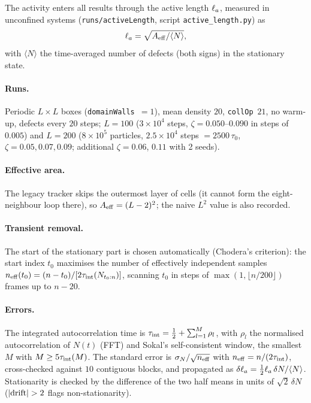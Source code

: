 The activity enters all results through the active length $\ell_a$, measured in unconfined systems
(\texttt{runs/activeLength}, script \texttt{active\_length.py}) as
\begin{equation}
  \ell_a=\sqrt{A_{\rm eff}/\langle N\rangle},
  \label{eq:md-la}
\end{equation}
with $\langle N\rangle$ the time-averaged number of defects (both signs) in the stationary state.

\paragraph{Runs.} Periodic $L\times L$ boxes (\texttt{domainWalls}~$=1$), mean density $20$, \texttt{collOp}~$21$, no warm-up,
defects every $20$ steps; $L=100$ ($3\times10^4$ steps, $\zeta=0.050$--$0.090$ in steps of $0.005$) and $L=200$
($8\times10^5$ particles, $2.5\times10^4$ steps $=2500\,\tau_0$, $\zeta=0.05,0.07,0.09$; additional $\zeta=0.06$, $0.11$ with 2 seeds).

\paragraph{Effective area.} The legacy tracker skips the outermost layer of cells (it cannot form the eight-neighbour loop
there), so $A_{\rm eff}=(L-2)^2$; the naive $L^2$ value is also recorded.

\paragraph{Transient removal.} The start of the stationary part is chosen automatically (Chodera's criterion): the start index
$t_0$ maximises the number of effectively independent samples $n_{\rm eff}(t_0)=(n-t_0)/[2\tau_{\rm int}(N_{t_0:n})]$, scanning
$t_0$ in steps of $\max(1,\lfloor n/200\rfloor)$ frames up to $n-20$.

\paragraph{Errors.} The integrated autocorrelation time is $\tau_{\rm int}=\tfrac12+\sum_{l=1}^{M}\rho_l$, with $\rho_l$ the
normalised autocorrelation of $N(t)$ (FFT) and Sokal's self-consistent window, the smallest $M$ with $M\ge5\tau_{\rm int}(M)$.
The standard error is $\sigma_N/\sqrt{n_{\rm eff}}$ with $n_{\rm eff}=n/(2\tau_{\rm int})$, cross-checked against $10$ contiguous
blocks, and propagated as $\delta\ell_a=\tfrac12\ell_a\,\delta N/\langle N\rangle$. Stationarity is checked by the difference of the two half
means in units of $\sqrt2\,\delta N$ ($|{\rm drift}|>2$ flags non-stationarity).

